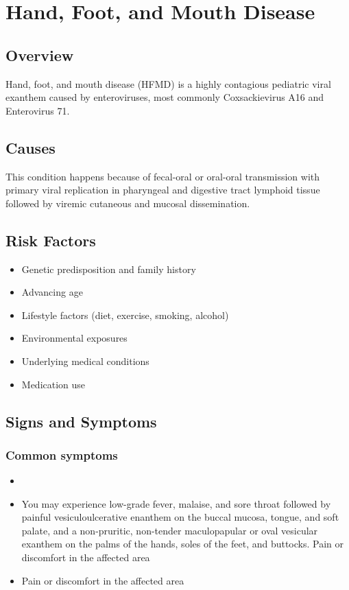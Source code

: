 \chapter{Hand, Foot, and Mouth Disease}
\label{sec:Hand, Foot, and Mouth Disease}

\section{Overview}
Hand, foot, and mouth disease (HFMD) is a highly contagious pediatric viral exanthem caused by enteroviruses, most commonly Coxsackievirus A16 and Enterovirus 71.
\section{Causes}
This condition happens because of fecal-oral or oral-oral transmission with primary viral replication in pharyngeal and digestive tract lymphoid tissue followed by viremic cutaneous and mucosal dissemination.     
\section{Risk Factors}

\begin{itemize}[noitemsep]
  \item Genetic predisposition and family history
  \item Advancing age
  \item Lifestyle factors (diet, exercise, smoking, alcohol)
  \item Environmental exposures
  \item Underlying medical conditions
  \item Medication use
\end{itemize}
\section{Signs and Symptoms}

\subsection{Common symptoms}
\begin{itemize}[noitemsep]
  \item \item You may experience low-grade fever, malaise, and sore throat followed by painful vesiculoulcerative enanthem on the buccal mucosa, tongue, and soft palate, and a non-pruritic, non-tender maculopapular or oval vesicular exanthem on the palms of the hands, soles of the feet, and buttocks. Pain or discomfort in the affected area    \item Pain or discomfort in the affected area
  \end{itemize}

